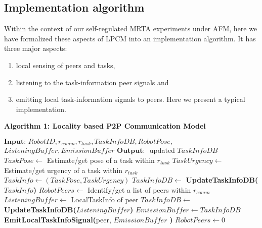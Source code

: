 \subsection{Implementation algorithm}
Within the context of our self-regulated MRTA experiments under AFM,  here we have formalized these aspects of LPCM into an implementation algorithm. It has three major aspects: 
\begin{enumerate}
\item local sensing of peers and tasks,
\item listening to the task-information peer signals and 
\item emitting local task-information signals to peers. Here we present a typical implementation.
\end{enumerate}
\textbf{\small Algorithm 1: Locality based P2P Communication Model}
\begin{algorithmic}[1]
\label{alg:lpcm}
\State $\textbf{Input: } RobotID, r_{comm}, r_{task}, TaskInfoDB, RobotPose,$\\ \hspace*{1cm}$ListeningBuffer, EmissionBuffer$
\State $\textbf{Output: }$ updated $TaskInfoDB$
\State {}
\State $ TaskPose \gets $ Estimate/get pose of a task within $r_{task}$
\State $ TaskUrgency \gets $ Estimate/get urgency of a task within $r_{task}$
\State $ TaskInfo \gets (TaskPose, TaskUrgency) $ 
\State $TaskInfoDB \gets$ \textbf{UpdateTaskInfoDB(}$TaskInfo$\textbf{)}
\State {}
\State $ RobotPeers \gets $ Identify/get a list of peers within $r_{comm}$
\State $ListeningBuffer \gets $ LocalTaskInfo of peer
\State $TaskInfoDB \gets$ \textbf{UpdateTaskInfoDB(}$ListeningBuffer$\textbf{)}
\EndIf
\EndFor
\State {}
\State $ EmissionBuffer \gets TaskInfoDB$
\State \textbf{EmitLocalTaskInfoSignal(}peer, $EmissionBuffer$ \textbf{) }
\EndFor
\State $RobotPeers \gets 0$
\end{algorithmic}

